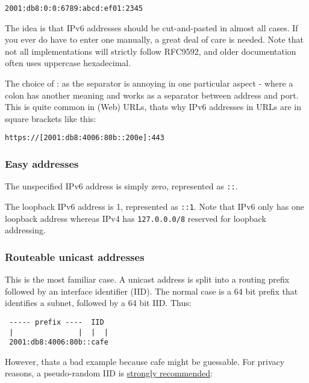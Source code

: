 \documentclass[
]{article}
\begin{document}
\begin{verbatim}
2001:db8:0:0:6789:abcd:ef01:2345
\end{verbatim}

The idea is that IPv6 addresses should be cut-and-pasted in almost all
cases. If you ever do have to enter one manually, a great deal of care
is needed. Note that not all implementations will strictly follow
RFC9592, and older documentation often uses uppercase hexadecimal.

The choice of \textquotesingle:\textquotesingle{} as the separator is
annoying in one particular aspect - where a colon has another meaning
and works as a separator between address and port. This is quite common
in (Web) URLs, that\textquotesingle s why IPv6 addresses in URLs are in
square brackets like this:

\begin{verbatim}
https://[2001:db8:4006:80b::200e]:443
\end{verbatim}

\subsubsection{Easy addresses}\label{easy-addresses}

The unspecified IPv6 address is simply zero, represented as \texttt{::}.

The loopback IPv6 address is 1, represented as \texttt{::1}. Note that
IPv6 only has one loopback address whereas IPv4 has \texttt{127.0.0.0/8}
reserved for loopback addressing.

\subsubsection{Routeable unicast
addresses}\label{routeable-unicast-addresses}

This is the most familiar case. A unicast address is split into a
routing prefix followed by an interface identifier (IID). The normal
case is a 64 bit prefix that identifies a subnet, followed by a 64 bit
IID. Thus:

\begin{verbatim}
 ----- prefix ----  IID
 |               |  |  |
 2001:db8:4006:80b::cafe
\end{verbatim}

However, that\textquotesingle s a bad example because
\textquotesingle cafe\textquotesingle{} might be guessable. For privacy
reasons, a pseudo-random IID is
\href{https://www.rfc-editor.org/info/rfc8064}{strongly recommended}:
\end{document}

